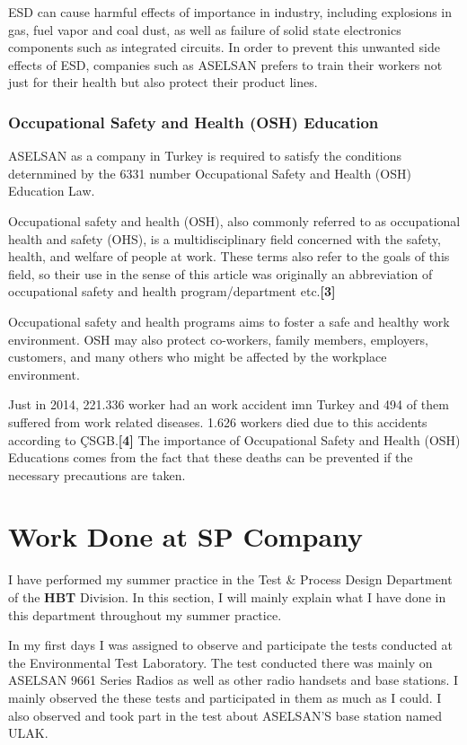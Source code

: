 	ESD can cause harmful effects of importance in industry, including explosions in gas, fuel vapor and coal dust, as well as failure of solid state electronics components such as integrated circuits. In order to prevent this unwanted side effects of ESD, companies such as ASELSAN prefers to train their workers not just for their health but also protect their product lines. 


\subsubsection{Occupational Safety and Health (OSH) Education}
\- \indent

	ASELSAN as a company in Turkey is required to satisfy the conditions deternmined by the 6331 number Occupational Safety and Health (OSH) Education Law. 
	
	Occupational safety and health (OSH), also commonly referred to as occupational health and safety (OHS), is a multidisciplinary field concerned with the safety, health, and welfare of people at work. These terms also refer to the goals of this field, so their use in the sense of this article was originally an abbreviation of occupational safety and health program/department etc.\textbf{[3]}

	Occupational safety and health programs aims to foster a safe and healthy work environment. OSH may also protect co-workers, family members, employers, customers, and many others who might be affected by the workplace environment. 

	Just in 2014, 221.336 worker had an work accident imn Turkey and 494 of them suffered from work related diseases. 1.626 workers died due to this accidents according to ÇSGB.\textbf{[4]} The importance of Occupational Safety and Health (OSH) Educations comes from the fact that these deaths can be prevented if the necessary precautions are taken.

\section{Work Done at SP Company}
\- \indent
	I have performed my summer practice in the Test \& Process Design Department of the \textbf{HBT} Division. In this section, I will mainly explain what I have done in this department throughout my summer practice.
	 
	In my first days I was assigned to observe and participate the tests conducted at the Environmental   Test Laboratory. The test conducted there was mainly on ASELSAN 9661 Series Radios as well as other radio handsets and base stations. I mainly observed the these tests and participated in them as much as I could. I also observed and took part in the test about ASELSAN'S base station named ULAK. 

